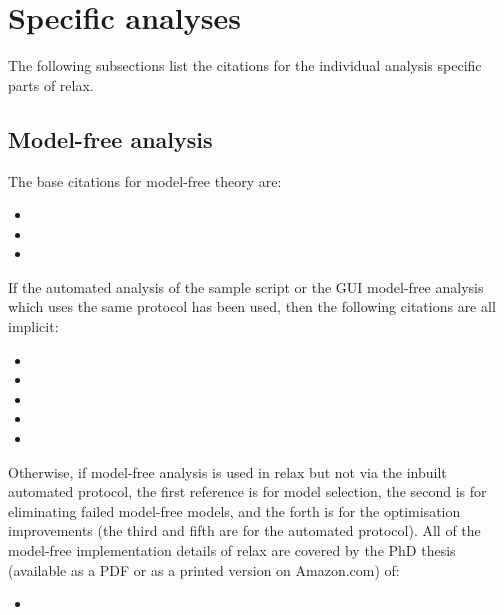 
\section{Specific analyses}

The following subsections list the citations for the individual analysis specific parts of relax.



\subsection{Model-free analysis}

The base citations for model-free theory are:

\begin{itemize}
\item {}
\item {}
\item {}
\end{itemize}

If the automated analysis of the  sample script or the GUI model-free analysis which uses the same protocol has been used, then the following citations are all implicit:

\begin{itemize}
\item {}
\item {}
\item {}
\item {}
\item {}
\end{itemize}

Otherwise, if model-free analysis is used in relax but not via the inbuilt automated protocol, the first reference is for model selection, the second is for eliminating failed model-free models, and the forth is for the optimisation improvements (the third and fifth are for the automated protocol).  All of the model-free implementation details of relax are covered by the PhD thesis (available as a PDF or as a printed version on Amazon.com) of:

\begin{itemize}
\item {}
\end{itemize}

